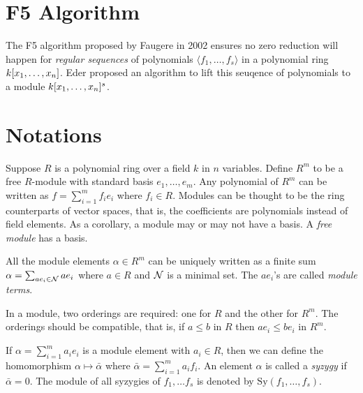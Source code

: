 \documentclass[twoside]{article}
\begin{document}



\section{F5 Algorithm}
\label{sec:f5-algorithm}

The F5 algorithm proposed by Faugere in 2002 ensures no zero reduction will
happen for \emph{regular sequences} of polynomials \(\langle f_1, \ldots, f_s
\rangle\) in a polynomial ring \(k[x_1, \ldots, x_n]\). Eder proposed an
algorithm to lift this seuqence of polynomials to a module \(k[x_1,
\ldots, x_n]^s\).

\section{Notations}
\label{sec:notations}

Suppose \(R\) is a polynomial ring over a field \(k\) in \(n\) variables. Define
\(R^m\) to be a free \(R\)-module with standard basis \(e_1, \ldots, e_m\). Any
polynomial of \(R^m\) can be written as \(f = \sum_{i=1}^m f_i e_i\) where \(f_i
\in R\). Modules can be thought to be the ring counterparts of vector spaces,
that is, the coefficients are polynomials instead of field elements. As a
corollary, a module may or may not have a basis. A \emph{free module} has a
basis.

All the module elements \(\alpha \in R^m\) can be uniquely written as a finite
sum \(\alpha = \sum_{ae_i \in \mathcal N} ae_i\) where \(a \in R\) and \(\mathcal N\) is a
minimal set. The \(ae_i\)'s are called \emph{module terms}.

In a module, two orderings are required: one for \(R\) and the other for
\(R^m\). The orderings should be compatible, that is, if \(a \leq b\) in \(R\)
then \(ae_i \leq be_i\) in \(R^m\).

If \(\alpha = \sum_{i=1}^m a_i e_i\) is a module element with \(a_i \in R\),
then we can define the homomorphism \(\alpha \mapsto \bar{\alpha}\) where
\(\bar{\alpha} = \sum_{i=1}^m a_i f_i\). An element \(\alpha\) is called a
\emph{syzygy} if \(\bar{\alpha} = 0\). The module of all syzygies of \(f_1,
\ldots f_s\) is denoted by \(\mathrm{Sy}(f_1, \ldots, f_s)\).
\end{document}
